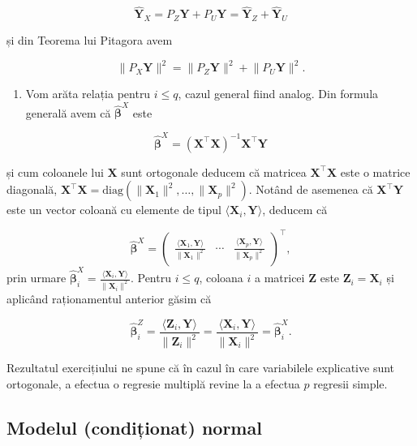 \documentclass[]{article}
\providecommand{\tightlist}{%
  \setlength{\itemsep}{0pt}\setlength{\parskip}{0pt}}
\begin{document}
\[
  \hat{\boldsymbol Y}_X = P_Z\boldsymbol Y + P_U\boldsymbol Y = \hat{\boldsymbol Y}_Z + \hat{\boldsymbol Y}_U
\]

și din Teorema lui Pitagora avem

\[
  \lVert P_X\boldsymbol Y\rVert^2 = \lVert P_Z\boldsymbol Y\rVert^2 + \lVert P_U\boldsymbol Y\rVert^2. 
\]

\begin{enumerate}
\def\labelenumi{\arabic{enumi}.}
\setcounter{enumi}{1}
\tightlist
\item
  Vom arăta relația pentru \(i\leq q\), cazul general fiind analog. Din
  formula generală avem că \(\hat{\boldsymbol\beta}^X\) este
\end{enumerate}

\[
  \hat{\boldsymbol\beta}^X = \left(\boldsymbol X^\intercal \boldsymbol X\right)^{-1}\boldsymbol X^\intercal\boldsymbol Y
\]

și cum coloanele lui \(\boldsymbol X\) sunt ortogonale deducem că
matricea \(\boldsymbol X^\intercal\boldsymbol X\) este o matrice
diagonală,
\(\boldsymbol X^\intercal\boldsymbol X = \mathrm{diag}\left(\lVert\boldsymbol X_1\rVert^2, \ldots, \lVert\boldsymbol X_p\rVert^2\right)\).
Notând de asemenea că \(\boldsymbol X^\intercal\boldsymbol Y\) este un
vector coloană cu elemente de tipul
\(\langle\boldsymbol X_i, \boldsymbol Y\rangle\), deducem că

\[
  \hat{\boldsymbol\beta}^X = \begin{pmatrix}\frac{\langle\boldsymbol X_1, \boldsymbol Y\rangle}{\lVert\boldsymbol X_1\rVert^2} & \cdots & \frac{\langle\boldsymbol X_p, \boldsymbol Y\rangle}{\lVert\boldsymbol X_p\rVert^2}\end{pmatrix}^\intercal,
\] prin urmare
\(\hat{\boldsymbol\beta}_i^X = \frac{\langle\boldsymbol X_i, \boldsymbol Y\rangle}{\lVert\boldsymbol X_i\rVert^2}\).
Pentru \(i\leq q\), coloana \(i\) a matricei \(\boldsymbol Z\) este
\(\boldsymbol Z_i = \boldsymbol X_i\) și aplicând raționamentul anterior
găsim că

\[
\hat{\boldsymbol\beta}_i^Z = \frac{\langle\boldsymbol Z_i, \boldsymbol Y\rangle}{\lVert\boldsymbol Z_i\rVert^2} = \frac{\langle\boldsymbol X_i, \boldsymbol Y\rangle}{\lVert\boldsymbol X_i\rVert^2} = \hat{\boldsymbol\beta}_i^X.
\]

Rezultatul exercițiului ne spune că în cazul în care variabilele
explicative sunt ortogonale, a efectua o regresie multiplă revine la a
efectua \(p\) regresii simple.

\hypertarget{modelul-conditionat-normal}{%
\subsection{Modelul (condiționat)
normal}\label{modelul-conditionat-normal}}
\end{document}

